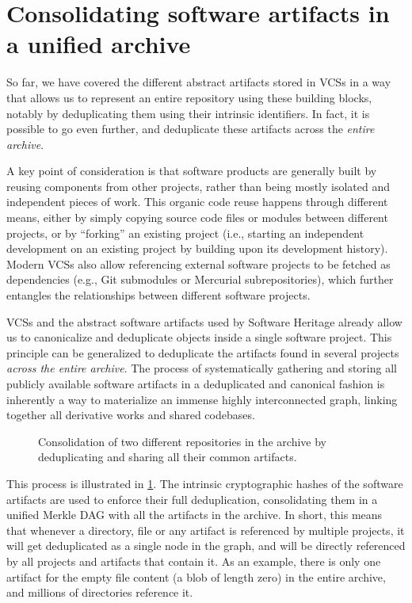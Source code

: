\section{Consolidating software artifacts in a unified archive}%
\label{sec:consolidation}

So far, we have covered the different abstract artifacts stored in \glspl{VCS}
in a way that allows us to represent an entire repository using these building
blocks, notably by deduplicating them using their intrinsic identifiers.
In fact, it is possible to go even further, and deduplicate these artifacts
across the \emph{entire archive}.

A key point of consideration is that software products are generally built by
reusing components from other projects, rather than being mostly isolated and
independent pieces of work. This organic code reuse happens through different
means, either by simply copying source code files or modules between different
projects, or by ``forking'' an existing project (i.e., starting an independent
development on an existing project by building upon its development history).
Modern \glspl{VCS} also allow referencing external software projects to be
fetched as dependencies (e.g., Git submodules or Mercurial subrepositories),
which further entangles the relationships between different software projects.

\glspl{VCS} and the abstract software artifacts used by Software Heritage
already allow us to canonicalize and deduplicate objects inside a single
software project. This principle can be generalized to deduplicate the
artifacts found in several projects \emph{across the entire archive}.
The process of systematically gathering and storing all publicly available
software artifacts in a deduplicated and canonical fashion is inherently a way
to materialize an immense highly interconnected graph, linking together all
derivative works and shared codebases.

\begin{figure}
    \centering
    
    \caption{Consolidation of two different repositories in the archive by
    deduplicating and sharing all their common artifacts.}%
    \label{fig:consolidating-archive}
\end{figure}

This process is illustrated in \cref{fig:consolidating-archive}. The
intrinsic cryptographic hashes of the software artifacts are used to enforce
their full deduplication, consolidating them in a unified Merkle \gls{DAG} with
all the artifacts in the archive.
%
In short, this means that whenever a directory, file or any artifact is
referenced by multiple projects, it will get deduplicated as a single node in
the graph, and will be directly referenced by all projects and artifacts
that contain it. As an example, there is only one artifact for the empty
file content (a blob of length zero) in the entire archive, and millions of
directories reference it.

